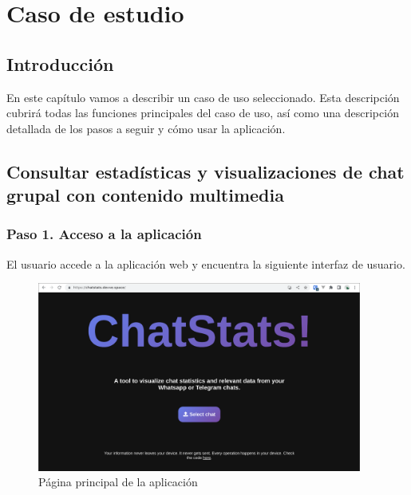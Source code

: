 \chapter{Caso de estudio}
\label{chap:case-study}

\section{Introducción}
\label{sec:5:introduction}


En este capítulo vamos a describir un caso de uso seleccionado. Esta descripción cubrirá todas las funciones principales del caso de uso, así como una descripción detallada de los pasos a seguir y cómo usar la aplicación.

\section{Consultar estadísticas y visualizaciones de chat grupal con contenido multimedia}



\subsection{Paso 1. Acceso a la aplicación}

El usuario accede a la aplicación web y encuentra la siguiente interfaz de usuario.

\begin{figure}[H]
	\centering
	\includegraphics[width=0.95\textwidth]{img/study_case/step1.png}
	\caption{Página principal de la aplicación}
	\label{fig:chap5:step_1}
\end{figure}

